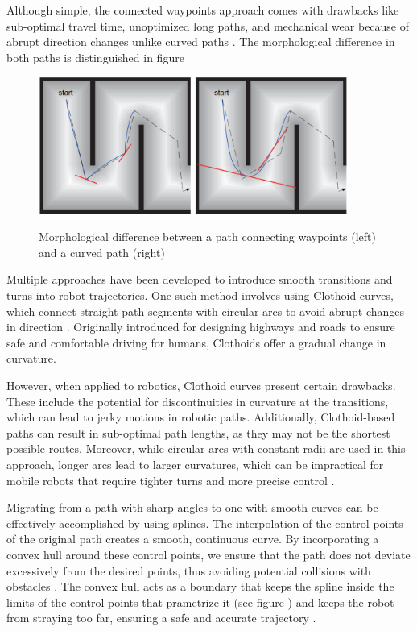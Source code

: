  
Although simple,
the connected waypoints approach comes with drawbacks like sub-optimal travel time, unoptimized long paths, 
and mechanical wear because of abrupt direction changes unlike curved paths \cite{R30}. The morphological 
difference in both paths is distinguished in figure  

\begin{figure}[H]
    \begin{center}
        \includegraphics[width=4in]{images/Chap1/sharp-vs-curved-path.png}\\
        \caption{Morphological difference between a path connecting waypoints (left) and a curved path 
        (right) \cite{R30}}
        \label{paths}
    \end{center}
\end{figure}

Multiple approaches have been developed to introduce smooth transitions and turns into robot trajectories. 
One such method involves using Clothoid curves, which connect straight path segments with circular arcs 
to avoid abrupt changes in direction \cite{R31}. Originally introduced for designing highways and roads to 
ensure safe and comfortable driving for humans, Clothoids offer a gradual change in curvature.

However, when applied to robotics, Clothoid curves present certain drawbacks. These include the potential 
for discontinuities in curvature at the transitions, which can lead to jerky motions in robotic paths. 
Additionally, Clothoid-based paths can result in sub-optimal path lengths, as they may not be the shortest 
possible routes. Moreover, while circular arcs with constant radii are used in this approach, longer 
arcs lead to larger curvatures, which can be impractical for mobile robots that require tighter turns 
and more precise control \cite{R31}.

Migrating from a path with sharp angles to one with smooth curves can be effectively accomplished by 
using splines. The interpolation of the control points of the original path 
creates a smooth, continuous curve. By incorporating a convex hull around these control points, we 
ensure that the path does not deviate excessively from the desired points, thus avoiding potential 
collisions with obstacles \cite{R33}. The convex hull acts as a boundary that keeps the spline inside the limits of 
the control points that prametrize it (see figure ) and keeps the robot from straying 
too far, ensuring a safe and accurate trajectory \cite{R29}.

